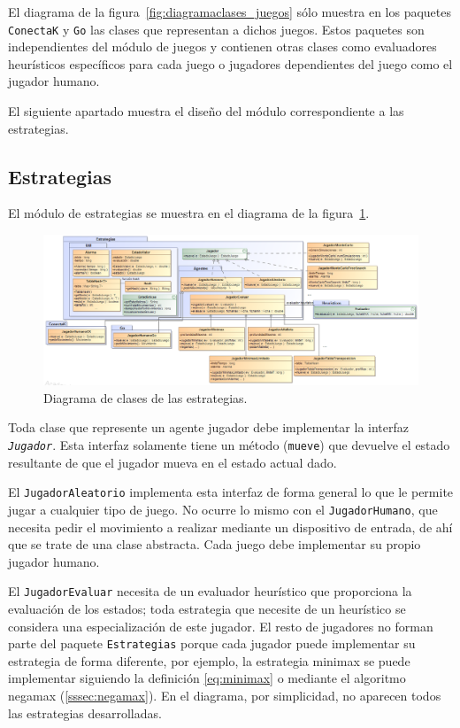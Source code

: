 El diagrama de la figura~\ref{fig:diagramaclases_juegos} sólo muestra en los paquetes \texttt{ConectaK} y \texttt{Go} las clases que representan a dichos juegos.
Estos paquetes son independientes del módulo de juegos y contienen otras clases como evaluadores heurísticos específicos para cada juego o jugadores dependientes del juego como el jugador humano.

\bigskip
El siguiente apartado muestra el diseño del módulo correspondiente a las estrategias.

\subsection{Estrategias}
\label{ssec:arquitectura_estrategias}
El módulo de estrategias se muestra en el diagrama de la figura~\ref{fig:diagramaclases_estrategias}.

\begin{figure}[!p]
	\centering
	\includegraphics[scale=0.4,angle=90]{contenido/cap6/imagenes/diagramaclases_estrategias.eps}
	\caption{Diagrama de clases de las estrategias.}
	\label{fig:diagramaclases_estrategias}
\end{figure}

Toda clase que represente un agente jugador debe implementar la interfaz \texttt{\textit{Jugador}}.
Esta interfaz solamente tiene un método (\texttt{mueve}) que devuelve el estado resultante de que el jugador mueva en el estado actual dado.

El \texttt{JugadorAleatorio} implementa esta interfaz de forma general lo que le permite jugar a cualquier tipo de juego.
No ocurre lo mismo con el \texttt{JugadorHumano}, que necesita pedir el movimiento a realizar mediante un dispositivo de entrada, de ahí que se trate de una clase abstracta.
Cada juego debe implementar su propio jugador humano.

El \texttt{JugadorEvaluar} necesita de un evaluador heurístico que proporciona la evaluación de los estados; toda estrategia que necesite de un heurístico se considera una especialización de este jugador.
El resto de jugadores no forman parte del paquete \texttt{Estrategias} porque cada jugador puede implementar su estrategia de forma diferente, por ejemplo, la estrategia minimax se puede implementar siguiendo la definición \ref{eq:minimax} o mediante el algoritmo negamax (\ref{sssec:negamax}).
En el diagrama, por simplicidad, no aparecen todos las estrategias desarrolladas.

